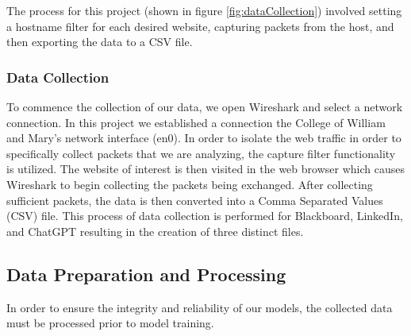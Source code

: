 \documentclass[10pt,sigconf,letterpaper,nonacm]{acmart}
\begin{document}
 The process for this project (shown in figure \ref{fig:dataCollection}) involved setting a hostname filter for each desired website, capturing packets from the host, and then exporting the data to a CSV file.

 \subsubsection{Data Collection}
To commence the collection of our data, we open Wireshark and select a network connection. 
In this project we established a connection the College of William and Mary's network interface (en0). In order to isolate the web traffic in order to specifically collect 
packets that we are analyzing, the capture filter functionality is utilized. The website of interest is then visited in the web browser which causes Wireshark to begin collecting the packets being exchanged.
After collecting sufficient packets, the data is then converted into a Comma Separated Values (CSV) file. This process of data collection is performed for Blackboard, LinkedIn, and ChatGPT resulting in the creation of 
three distinct files. 

\subsection{Data Preparation and Processing}
In order to ensure the integrity and reliability of our models,
the collected data must be processed prior to model training.
\end{document}
